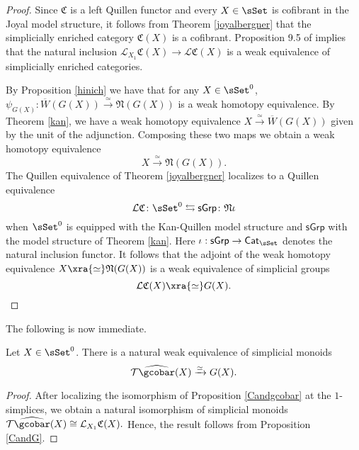 \begin{proof}
Since $\mathfrak{C}$ is a left Quillen functor and every $X \in \sSet$ is cofibrant in the Joyal model structure, it follows from Theorem \ref{joyalbergner} that the simplicially enriched category $\mathfrak{C}(X)$ is a cofibrant. Proposition 9.5 of \cite{dwyer1980simplicial} implies that the natural inclusion $\mathcal{L}_{X_1} \mathfrak{C}(X) \to \mathcal{L}\mathfrak{C}(X)$ is a weak equivalence of simplicially enriched categories. 

By Proposition \ref{hinich} we have that for any $X \in \sSet^0$, $\psi_{G(X)}: \overline{W}(G(X)) \xrightarrow{\simeq} \mathfrak{N}(G(X))$ is a weak homotopy equivalence. By Theorem \ref{kan}, we have a weak homotopy equivalence $X \xrightarrow{\simeq} \overline{W}(G(X))$ given by the unit of the adjunction. Composing these two maps we obtain a weak homotopy equivalence
$$X \xrightarrow{\simeq} \mathfrak{N}(G(X)).$$ 
The Quillen equivalence of Theorem \ref{joyalbergner} localizes to a Quillen equivalence
$$\mathcal{L} \mathfrak{C} \colon \sSet^0 \leftrightarrows \mathsf{sGrp} \colon \mathfrak{N}\iota$$
when $\sSet^0$ is equipped with the Kan-Quillen model structure and $\mathsf{sGrp}$ with the model structure of Theorem \ref{kan}. Here $\iota: \mathsf{sGrp} \to \mathsf{Cat}_{\sSet}$ denotes the natural inclusion functor. It follows that the adjoint of the weak homotopy equivalence $X \xra{\simeq} \mathfrak{N}(G(X))$ is a weak equivalence of simplicial groups
$$\mathcal{L}\mathfrak{C}(X) \xra{\simeq} G(X).$$ 
\end{proof}
The following is now immediate.
\begin{corollary}\label{widehatgcobarandG} Let $X \in \sSet^0$. There is a natural weak equivalence of simplicial monoids
$$\mathcal{T} \widehat{\gcobar}(X) \xrightarrow{\simeq}G(X).$$
\end{corollary}
\begin{proof} After localizing the isomorphism of Proposition \ref{Candgcobar} at the $1$-simplices, we obtain a natural isomorphism of simplicial monoids $\mathcal{T} \widehat{\gcobar}(X) \cong \mathcal{L}_{X_1}\mathfrak{C}(X).$ Hence, the result follows from Proposition \ref{CandG}. 
\end{proof}